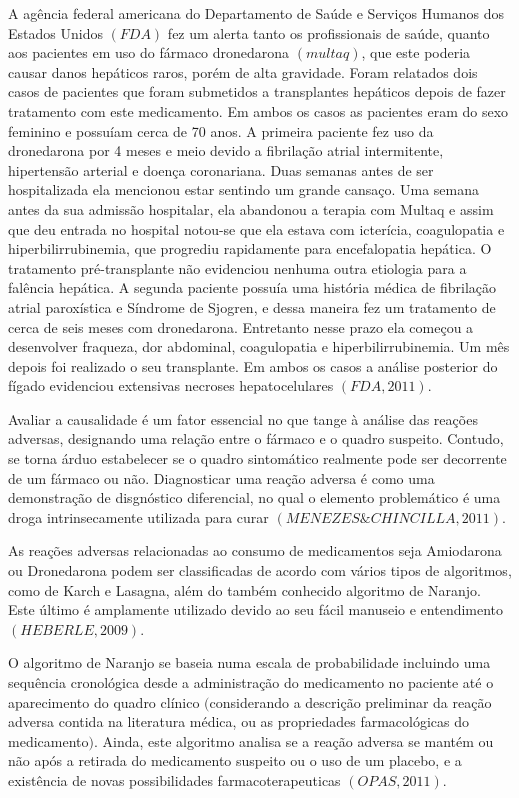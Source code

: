 \documentclass[svgnames,12pt,oneside, openright,a4paper]{scrbook}
\begin{document}
A agência federal americana do Departamento de Saúde e Serviços Humanos dos Estados Unidos $(FDA)$ fez um alerta tanto os profissionais de saúde, quanto aos pacientes em uso do fármaco dronedarona $(multaq)$, que este poderia causar danos hepáticos raros, porém de alta gravidade. Foram relatados dois casos de pacientes que foram submetidos a transplantes hepáticos depois de fazer tratamento com este medicamento.  Em ambos os casos as pacientes eram do sexo feminino e possuíam cerca de 70 anos. A primeira paciente fez uso da dronedarona por 4 meses e meio devido a fibrilação atrial intermitente, hipertensão arterial e doença coronariana. Duas semanas antes de ser hospitalizada ela mencionou estar sentindo um grande cansaço. Uma semana antes da sua admissão hospitalar, ela abandonou a terapia com Multaq e assim que deu entrada no hospital notou-se que ela estava com icterícia, coagulopatia e hiperbilirrubinemia, que progrediu rapidamente para encefalopatia hepática. O tratamento pré-transplante não evidenciou nenhuma outra etiologia para a falência hepática. A segunda paciente possuía uma história médica de fibrilação atrial paroxística e Síndrome de Sjogren, e dessa maneira fez um tratamento de cerca de seis meses com dronedarona. Entretanto nesse prazo ela começou a desenvolver fraqueza, dor abdominal, coagulopatia e hiperbilirrubinemia. Um mês depois foi realizado o seu transplante. Em ambos os casos a análise posterior do fígado evidenciou extensivas necroses hepatocelulares $(FDA, 2011)$.

Avaliar a causalidade é um fator essencial no que tange à análise das reações adversas, designando uma relação entre o fármaco e o quadro suspeito. Contudo, se torna árduo estabelecer se o quadro sintomático realmente pode ser decorrente de um fármaco ou não. Diagnosticar uma reação adversa é como uma demonstração de disgnóstico diferencial, no qual o elemento problemático é uma droga intrinsecamente utilizada para curar $(MENEZES \& CHINCILLA, 2011)$. 

As reações adversas relacionadas ao consumo de medicamentos seja Amiodarona ou Dronedarona podem ser classificadas de acordo com vários tipos de algoritmos, como de Karch e Lasagna, além do também conhecido algoritmo de Naranjo. Este último é amplamente utilizado devido ao seu fácil manuseio e entendimento $(HEBERLE, 2009)$.

O algoritmo de Naranjo se baseia numa escala de probabilidade incluindo uma sequência cronológica desde a administração do medicamento no paciente até o aparecimento do quadro clínico $($considerando a descrição preliminar da reação adversa contida na literatura médica, ou as propriedades farmacológicas do medicamento$)$. Ainda, este algoritmo analisa se a reação adversa se mantém ou não após a retirada do medicamento suspeito ou o uso de um placebo, e a existência de novas possibilidades farmacoterapeuticas $(OPAS, 2011)$.  
\end{document}
